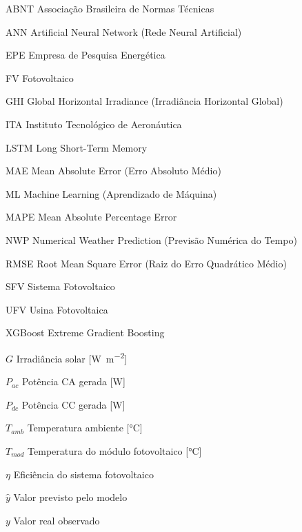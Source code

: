 \documentclass[
  12pt,
  openright,
  twoside,
  a4paper,
  brazil,
]{abntex2}
\begin{document}
\listoftables*
\cleardoublepage

\begin{siglas}
  \item[ABNT]  Associação Brasileira de Normas Técnicas
  \item[ANN]   Artificial Neural Network (Rede Neural Artificial)
  \item[EPE]   Empresa de Pesquisa Energética
  \item[FV]    Fotovoltaico
  \item[GHI]   Global Horizontal Irradiance (Irradiância Horizontal Global)
  \item[ITA]   Instituto Tecnológico de Aeronáutica
  \item[LSTM]  Long Short-Term Memory
  \item[MAE]   Mean Absolute Error (Erro Absoluto Médio)
  \item[ML]    Machine Learning (Aprendizado de Máquina)
  \item[MAPE]  Mean Absolute Percentage Error
  \item[NWP]   Numerical Weather Prediction (Previsão Numérica do Tempo)
  \item[RMSE]  Root Mean Square Error (Raiz do Erro Quadrático Médio)
  \item[SFV]   Sistema Fotovoltaico
  \item[UFV]   Usina Fotovoltaica
  \item[XGBoost] Extreme Gradient Boosting
\end{siglas}

\begin{simbolos}
  \item[$G$]       Irradiância solar [\si{\watt\per\square\meter}]
  \item[$P_{ac}$]  Potência CA gerada [\si{\watt}]
  \item[$P_{dc}$]  Potência CC gerada [\si{\watt}]
  \item[$T_{amb}$] Temperatura ambiente [\si{\celsius}]
  \item[$T_{mod}$] Temperatura do módulo fotovoltaico [\si{\celsius}]
  \item[$\eta$]    Eficiência do sistema fotovoltaico
  \item[$\hat{y}$] Valor previsto pelo modelo
  \item[$y$]       Valor real observado
\end{simbolos}
\end{document}
